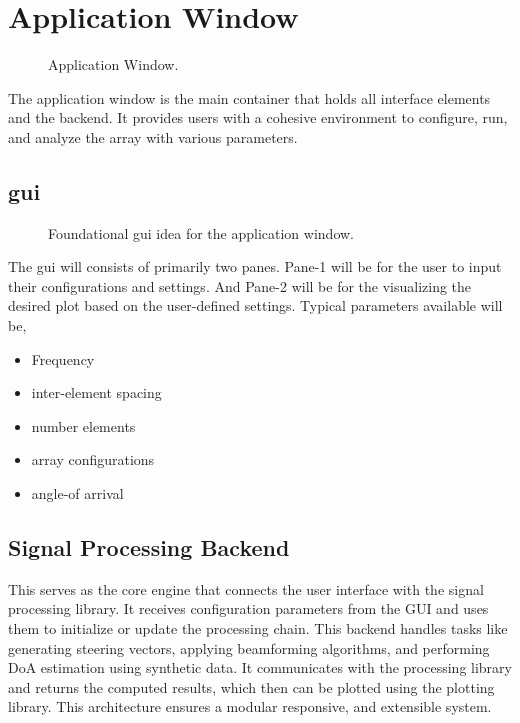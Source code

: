 \chapter{Application Window} \label{ch: application-window}

\begin{figure}[H]
	\centering
	
	\caption{Application Window.}
\end{figure}


The application window is the main container that holds all interface elements and the backend. It provides users with a cohesive environment to configure, run, and analyze the array with various parameters.

\section{\acf{gui}}

\begin{figure}[H]
	\centering
	
	\caption{Foundational \ac{gui} idea for the application window.}
\end{figure}

The \ac{gui} will consists of primarily two panes. Pane-1 will be for the user to input their configurations and settings. And Pane-2 will be for the visualizing the desired plot based on the user-defined settings. Typical parameters available will be,

\begin{itemize}
	\item Frequency
	\item inter-element spacing
	\item number elements
	\item array configurations
	\item angle-of arrival
\end{itemize}

\section{Signal Processing Backend}

This serves as the core engine that connects the user interface with the signal processing library. It receives configuration parameters from the GUI and uses them to initialize or update the processing chain. This backend handles tasks like generating steering vectors, applying beamforming algorithms, and performing DoA estimation using synthetic data. It communicates with the processing library and returns the computed results, which then can be plotted using the plotting library. This architecture ensures a modular responsive, and extensible system.

